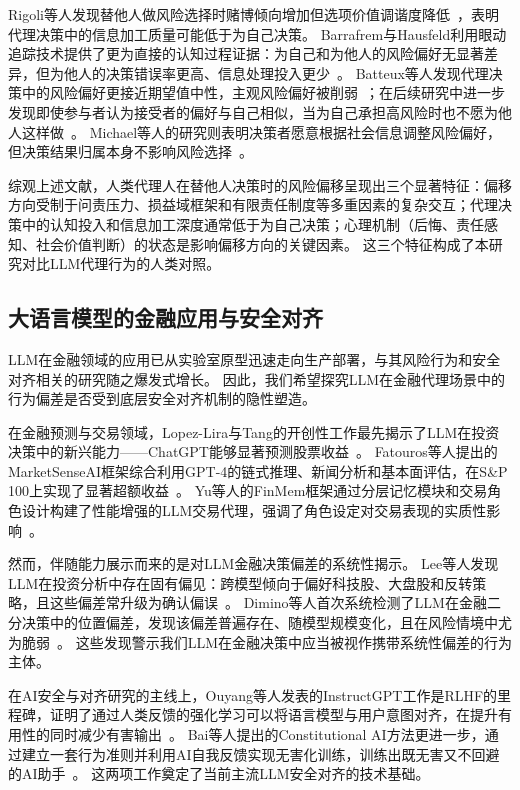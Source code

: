 \documentclass[journal]{vgtc}
\begin{document}
Rigoli等人发现替他人做风险选择时赌博倾向增加但选项价值调谐度降低~\cite{Rigoli2018Risk}，表明代理决策中的信息加工质量可能低于为自己决策。
Barrafrem与Hausfeld利用眼动追踪技术提供了更为直接的认知过程证据：为自己和为他人的风险偏好无显著差异，但为他人的决策错误率更高、信息处理投入更少~\cite{Barrafrem2020Tracing}。
Batteux等人发现代理决策中的风险偏好更接近期望值中性，主观风险偏好被削弱~\cite{Batteux2017Risk}；在后续研究中进一步发现即使参与者认为接受者的偏好与自己相似，当为自己承担高风险时也不愿为他人这样做~\cite{Batteux2020Decisions}。
Michael等人的研究则表明决策者愿意根据社会信息调整风险偏好，但决策结果归属本身不影响风险选择~\cite{Michael2021Decision}。

综观上述文献，人类代理人在替他人决策时的风险偏移呈现出三个显著特征：偏移方向受制于问责压力、损益域框架和有限责任制度等多重因素的复杂交互；代理决策中的认知投入和信息加工深度通常低于为自己决策；心理机制（后悔、责任感知、社会价值判断）的状态是影响偏移方向的关键因素。
这三个特征构成了本研究对比LLM代理行为的人类对照。

\subsection{大语言模型的金融应用与安全对齐}

LLM在金融领域的应用已从实验室原型迅速走向生产部署，与其风险行为和安全对齐相关的研究随之爆发式增长。
因此，我们希望探究LLM在金融代理场景中的行为偏差是否受到底层安全对齐机制的隐性塑造。

在金融预测与交易领域，Lopez-Lira与Tang的开创性工作最先揭示了LLM在投资决策中的新兴能力——ChatGPT能够显著预测股票收益~\cite{LopezLira2023Can}。
Fatouros等人提出的MarketSenseAI框架综合利用GPT-4的链式推理、新闻分析和基本面评估，在S\&P 100上实现了显著超额收益~\cite{Fatouros2024Can}。
Yu等人的FinMem框架通过分层记忆模块和交易角色设计构建了性能增强的LLM交易代理，强调了角色设定对交易表现的实质性影响~\cite{Yu2023FinMem}。

然而，伴随能力展示而来的是对LLM金融决策偏差的系统性揭示。
Lee等人发现LLM在投资分析中存在固有偏见：跨模型倾向于偏好科技股、大盘股和反转策略，且这些偏差常升级为确认偏误~\cite{Lee2025Your}。
Dimino等人首次系统检测了LLM在金融二分决策中的位置偏差，发现该偏差普遍存在、随模型规模变化，且在风险情境中尤为脆弱~\cite{Dimino2025Tracing}。
这些发现警示我们LLM在金融决策中应当被视作携带系统性偏差的行为主体。

在AI安全与对齐研究的主线上，Ouyang等人发表的InstructGPT工作是RLHF的里程碑，证明了通过人类反馈的强化学习可以将语言模型与用户意图对齐，在提升有用性的同时减少有害输出~\cite{Ouyang2022Training}。
Bai等人提出的Constitutional AI方法更进一步，通过建立一套行为准则并利用AI自我反馈实现无害化训练，训练出既无害又不回避的AI助手~\cite{Bai2022Constitutional}。
这两项工作奠定了当前主流LLM安全对齐的技术基础。
\end{document}
